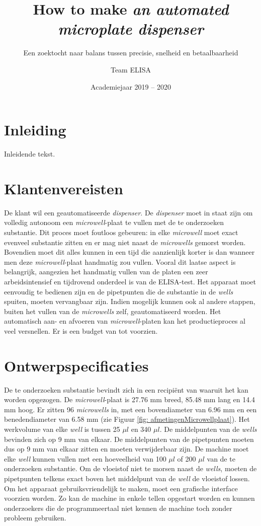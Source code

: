 \documentclass[a4paper,twoside,kulak]{kulakreport} %
\title{How to make \textit{an automated microplate dispenser}}
\subtitle{Een zoektocht naar balans tussen precisie, snelheid en betaalbaarheid}
\author{Team ELISA}
\institute{Matthias Derez, Maxime Dujardin, Korneel Verkens, Seppe Vilain}
\date{Academiejaar 2019 -- 2020}
\begin{document}
\sffamily
\titlepage

\tableofcontents

\chapter*{Inleiding}
Inleidende tekst.

\chapter{Klantenvereisten}
De klant wil een geautomatiseerde \textit{dispenser}. De \textit{dispenser} moet in staat zijn om volledig autonoom een \textit{microwell}-plaat te vullen met de te onderzoeken substantie. Dit proces moet foutloos gebeuren: in elke \textit{microwell} moet exact evenveel substantie zitten en er mag niet naast de \textit{microwells} gemorst worden. Bovendien moet dit alles kunnen in een tijd die aanzienlijk korter is dan wanneer men deze \textit{microwell}-plaat handmatig zou vullen. Vooral dit laatse aspect is belangrijk, aangezien het handmatig vullen van de platen een zeer arbeidsintensief en tijdrovend onderdeel is van de ELISA-test. Het apparaat moet eenvoudig te bedienen zijn en de pipetpunten die de substantie in de \textit{wells} spuiten, moeten vervangbaar zijn.  Indien mogelijk kunnen ook al andere stappen, buiten het vullen van de \textit{microwells} zelf, geautomatiseerd worden. Het automatisch aan- en afvoeren van \textit{microwell}-platen kan het productieproces al veel versnellen. Er is een budget van  tot  voorzien.
\chapter{Ontwerpspecificaties}
De te onderzoeken substantie bevindt zich in een recipiënt van waaruit het kan worden opgezogen. De \textit{microwell}-plaat is 27.76 mm breed, 85.48 mm lang en 14.4 mm hoog. Er zitten 96 \textit{microwells} in, met een bovendiameter van 6.96 mm en een benedendiameter van 6.58 mm (zie Figuur \ref{fig: afmetingenMicrowellplaat}). Het werkvolume van elke \textit{well} is tussen 25 $\mu l$ en 340 $\mu l$. De middelpunten van de \textit{wells} bevinden zich op 9 mm van elkaar. De middelpunten van de pipetpunten moeten dus op 9 mm van elkaar zitten en moeten verwijderbaar zijn. De machine moet elke \textit{well} kunnen vullen met een hoeveelheid van 100 $\mu l$ of 200 $\mu l$ van de te onderzoeken substantie. Om de vloeistof niet te morsen naast de \textit{wells}, moeten de pipetpunten telkens exact boven het middelpunt van de \textit{well} de vloeistof lossen. Om het apparaat gebruiksvriendelijk te maken, moet een grafische interface voorzien worden. Zo kan de machine in enkele tellen opgestart worden en kunnen onderzoekers die de programmeertaal niet kennen de machine toch zonder probleem gebruiken.
\end{document}
